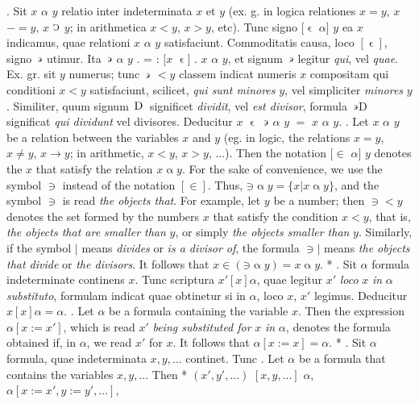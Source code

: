 \documentclass{book}
\newcommand{\C}{\mathop{\sbox0{$\displaystyle$$\reflectbox{C}$} %
\raisebox{-\height+\ht0-0.05cm}[\ht0][\dp0]{\scalebox{0.8}[0.8]{\copy0}}}\displaylimits} %
\newcommand{\such}{\thinspace \rotatebox[origin=c]{180}{$\epsilon$}}
\newcommand{\smallIn}{\ensuremath{\mathrel{\epsilon}}}
\newcommand{\D}{\mathop{\thinspace \text{D} \thinspace}}
\newenvironment{translateTwoCol}
               { %
                 \columnratio{0.5, 0.5} \begin{paracol}{2}
                 \newcommand{\LAT}{\switchcolumn[0]*}
                 \newcommand{\ENG}{\switchcolumn[1]}
               }
               { %
                 \let\ENG\undefined
                 \let\LAT\undefined
                 \end{paracol}
               }
\begin{document}
\begin{translateTwoCol}
. Sit $x$ $\alpha$ $y$ relatio inter indeterminata $x$ et $y$ (ex. g. in logica relationes $x = y$, $x$ $- = y$, $x$ $\C$ $y$; in arithmetica $x < y$, $x > y$, etc). Tunc signo $[\smallIn$ $\alpha]$ $y$ ea $x$ indicamus, quae relationi $x$ $\alpha$ $y$ satisfaciunt. Commoditatis causa, loco $[\smallIn]$, signo $\such$ utimur. Ita $\such$ $\alpha$ $y$ . = : $[x$ $\smallIn ]$ . $x$ $\alpha$ $y$, et signum $\such$ legitur \emph{qui}, vel \emph{quae}. Ex. gr. sit $y$ numerus; tunc $\such$ $< y$ classem indicat numeris $x$ compositam qui conditioni $x<y$ satisfaciunt, scilicet, \emph{qui sunt minores} $y$, vel simpliciter \emph{minores} $y$. Similiter, quum signum $\D$ significet \emph{dividit}, vel \emph{est divisor}, formula $\such$D significat \emph{qui dividunt} vel {divisores}. Deducitur $x$ $\smallIn$ $\such$ $\alpha$ $y$ $=$ $x$ $\alpha$ $y$.
\ENG
{}. Let $x$ $\alpha$ $y$ be a relation between the variables $x$ and $y$ (eg. in logic, the relations $x = y$, $x \not= y$, $x \rightarrow y$; in arithmetic, $x < y$, $x > y$, ...). Then the notation $[\in$ $\alpha]$ $y$ denotes the $x$ that satisfy the relation $x \mathbin{\alpha} y$. For the sake of convenience, we use the symbol $\ni$ instead of the notation $[\in]$. Thus, $\mathord{\ni} \mathbin{\alpha} y = \{ x | x \mathbin{\alpha} y \}$, and the symbol $\ni$ is read \emph{the objects that}. For example, let $y$ be a number; then $\ni < y$ denotes the set formed by the numbers $x$ that satisfy the condition $x<y$, that is, \emph{the objects that are smaller than} $y$, or simply \emph{the objects smaller than} $y$. Similarly, if the symbol $|$ means \emph{divides} or \emph{is a divisor of}, the formula $\ni|$ means \emph{the objects that divide} or \emph{the divisors}. It follows that $x \in (\mathord{\ni} \mathbin{\alpha} y) = x \mathbin{\alpha} y$.   %
\LAT
{}. Sit $\alpha$ formula indeterminate continens $x$. Tunc scriptura $x' [x] \alpha$, quae legitur $x'$ \emph{loco} $x$ \emph{in} $\alpha$ \emph{substituto}, formulam indicat quae obtinetur si in $\alpha$, loco $x$, $x'$ legimus. Deducitur $x [x] \alpha = \alpha$.
\ENG
{}. Let $\alpha$ be a formula containing the variable $x$. Then the expression $\alpha [ x := x' ]$, which is read $x'$ \emph{being substituted for} $x$ \emph{in} $\alpha$, denotes the formula obtained if, in $\alpha$, we read $x'$ for $x$. It follows that $\alpha[x := x] = \alpha$.
\LAT
{}. Sit $\alpha$ formula, quae indeterminata $x,y,...$ continet. Tunc
\ENG
{}. Let $\alpha$ be a formula that contains the variables $x,y,...$ Then
\LAT
\hspace{1.06cm} $(x',y',...)$ $[x,y,...]$ $\alpha$,
\ENG
\hspace{1.06cm} $\alpha[x:=x', y:=y', \ldots]$,
\end{translateTwoCol}
\end{document}
